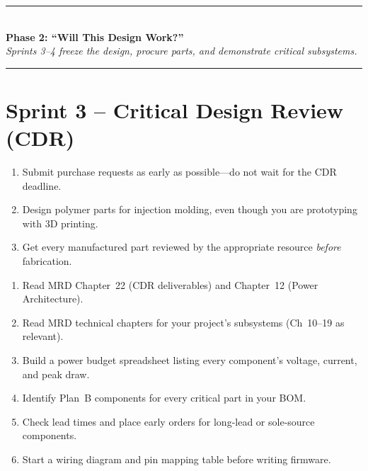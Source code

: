 \begin{center}
\textcolor{minesblue}{\rule{0.6\textwidth}{1pt}}\\[4pt]
{\Large\bfseries\sffamily\color{minesblue} Phase 2: ``Will This Design Work?''}\\[2pt]
{\small\itshape Sprints 3--4 freeze the design, procure parts, and demonstrate critical subsystems.}\\[4pt]
\textcolor{minesblue}{\rule{0.6\textwidth}{1pt}}
\end{center}
\vspace{0.5em}
\section{Sprint 3 -- Critical Design Review (CDR)}

\begin{priorities}
\begin{enumerate}[leftmargin=*, itemsep=1pt, topsep=0pt]
    \item Submit purchase requests as early as possible---do not wait for the CDR deadline.
    \item Design polymer parts for injection molding, even though you are prototyping with 3D printing.
    \item Get every manufactured part reviewed by the appropriate resource \textit{before} fabrication.
\end{enumerate}
\end{priorities}

\begin{checklistbox}
\begin{enumerate}[leftmargin=*, itemsep=1pt, topsep=0pt]
    \item Read MRD Chapter~22 (CDR deliverables) and Chapter~12 (Power Architecture).
    \item Read MRD technical chapters for your project's subsystems (Ch~10--19 as relevant).
    \item Build a power budget spreadsheet listing every component's voltage, current, and peak draw.
    \item Identify Plan~B components for every critical part in your BOM.
    \item Check lead times and place early orders for long-lead or sole-source components.
    \item Start a wiring diagram and pin mapping table before writing firmware.
\end{enumerate}
\end{checklistbox}

